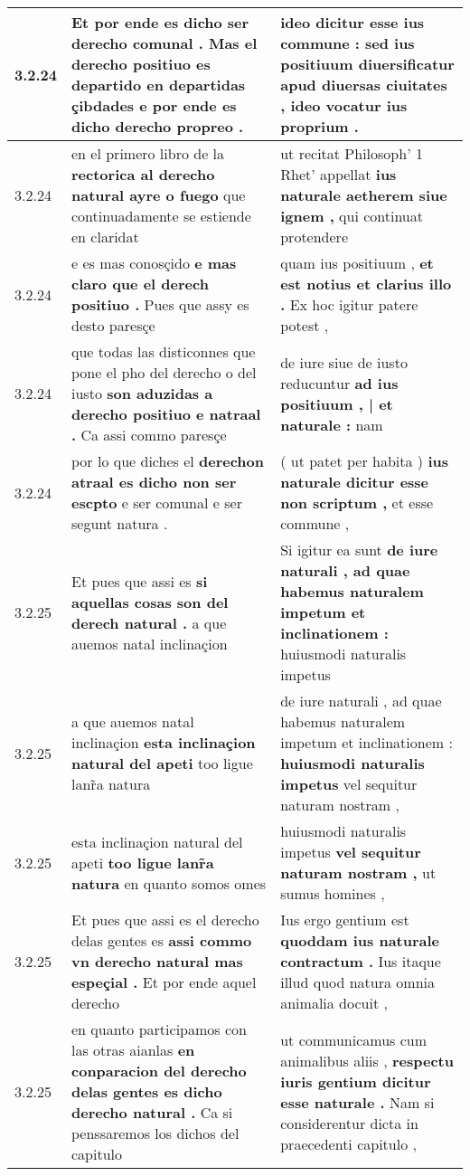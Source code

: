 \begin{tabular}{|p{1cm}|p{6.5cm}|p{6.5cm}|}
3.2.24 & Et por ende es dicho ser derecho comunal . \textbf{ Mas el derecho positiuo es departido en departidas çibdades } e por ende es dicho derecho propreo . & ideo dicitur esse ius commune : \textbf{ sed ius positiuum diuersificatur apud diuersas ciuitates , } ideo vocatur ius proprium . \\\hline
3.2.24 & en el primero libro de la \textbf{ rectorica al derecho natural ayre o fuego } que continuadamente se estiende en claridat & ut recitat Philosoph’ 1 Rhet’ appellat \textbf{ ius naturale aetherem siue ignem , } qui continuat protendere \\\hline
3.2.24 & e es mas conosçido \textbf{ e mas claro que el derech positiuo . } Pues que assy es desto paresçe & quam ius positiuum , \textbf{ et est notius et clarius illo . } Ex hoc igitur patere potest , \\\hline
3.2.24 & que todas las disticonnes que pone el pho del derecho o del iusto \textbf{ son aduzidas a derecho positiuo e natraal . } Ca assi commo paresçe & de iure siue de iusto reducuntur \textbf{ ad ius positiuum , | et naturale : } nam \\\hline
3.2.24 & por lo que diches el \textbf{ derechon atraal es dicho non ser escpto } e ser comunal e ser segunt natura . & ( ut patet per habita ) \textbf{ ius naturale dicitur esse non scriptum , } et esse commune , \\\hline
3.2.25 & Et pues que assi es \textbf{ si aquellas cosas son del derech natural . } a que auemos natal inclinaçion & Si igitur ea sunt \textbf{ de iure naturali , ad quae habemus naturalem impetum et inclinationem : } huiusmodi naturalis impetus \\\hline
3.2.25 & a que auemos natal inclinaçion \textbf{ esta inclinaçion natural del apeti } too ligue lanr̃a natura & de iure naturali , ad quae habemus naturalem impetum et inclinationem : \textbf{ huiusmodi naturalis impetus } vel sequitur naturam nostram , \\\hline
3.2.25 & esta inclinaçion natural del apeti \textbf{ too ligue lanr̃a natura } en quanto somos omes & huiusmodi naturalis impetus \textbf{ vel sequitur naturam nostram , } ut sumus homines , \\\hline
3.2.25 & Et pues que assi es el derecho delas gentes es \textbf{ assi commo vn derecho natural mas espeçial . } Et por ende aquel derecho & Ius ergo gentium est \textbf{ quoddam ius naturale contractum . } Ius itaque illud quod natura omnia animalia docuit , \\\hline
3.2.25 & en quanto participamos con las otras aianlas \textbf{ en conparacion del derecho delas gentes es dicho derecho natural . } Ca si penssaremos los dichos del capitulo & ut communicamus cum animalibus aliis , \textbf{ respectu iuris gentium dicitur esse naturale . } Nam si considerentur dicta in praecedenti capitulo , \\\hline

\end{tabular}
